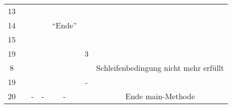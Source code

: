 \documentclass{scrartcl}
\begin{document}
\begin{center}
\begin{tabular}{ccccccc}
			&	&						&						&				&	& \\ %
	\midrule
	13		&	&						&						&				&	& \\
	14		&	&						&						& \enquote{Ende}		&	& \\
	15		&	&						&						&				&	& \\
	19		&	&						&						&				& 3	& \\
	8		&	&						&						&				&	& Schleifenbedingung nicht mehr erfüllt\\
	19		&	&						&						&				& -	& \\
	20		&	& -						& -						& -				& 	& Ende main-Methode\\
	\bottomrule
\end{tabular}
\end{center}
\end{document}

